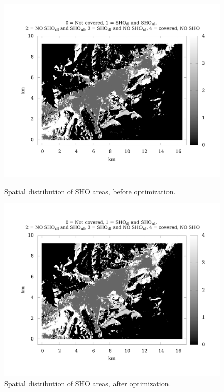 \begin{figure}
\centering

\begin{minipage}[t]{0.5\textwidth}%
\centering

\includegraphics[width=1\textwidth]{07-experimental_evaluation/img/sho_areas_initial}\vskip -0.3in

\caption{Spatial distribution of SHO areas, before optimization.\label{fig:sho_areas_initial}}
%
\end{minipage}\hfill{}%
\begin{minipage}[t]{0.5\textwidth}%
\centering

\includegraphics[width=1\textwidth]{07-experimental_evaluation/img/sho_areas_final}\vskip -0.3in

\caption{Spatial distribution of SHO areas, after optimization.\label{fig:sho_areas_final}}
%
\end{minipage}
\end{figure}


